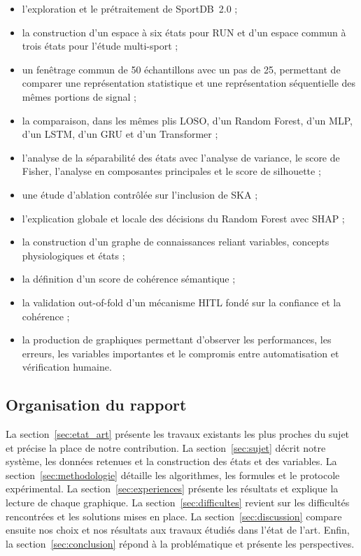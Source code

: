 \documentclass[12pt,a4paper]{article}
\begin{document}
\begin{itemize}[leftmargin=1.5em]
  \item l'exploration et le prétraitement de SportDB~2.0 ;
  \item la construction d'un espace à six états pour RUN et d'un espace commun
  à trois états pour l'étude multi-sport ;
  \item un fenêtrage commun de 50 échantillons avec un pas de 25, permettant
  de comparer une représentation statistique et une représentation
  séquentielle des mêmes portions de signal ;
  \item la comparaison, dans les mêmes plis LOSO, d'un Random Forest, d'un MLP,
  d'un LSTM, d'un GRU et d'un Transformer ;
  \item l'analyse de la séparabilité des états avec l'analyse de variance,
  le score de Fisher, l'analyse en composantes principales et le score de
  silhouette ;
  \item une étude d'ablation contrôlée sur l'inclusion de SKA ;
  \item l'explication globale et locale des décisions du Random Forest avec
  SHAP ;
  \item la construction d'un graphe de connaissances reliant variables,
  concepts physiologiques et états ;
  \item la définition d'un score de cohérence sémantique ;
  \item la validation out-of-fold d'un mécanisme HITL fondé sur la confiance
  et la cohérence ;
  \item la production de graphiques permettant d'observer les performances,
  les erreurs, les variables importantes et le compromis entre automatisation
  et vérification humaine.
\end{itemize}

\subsection{Organisation du rapport}

La section~\ref{sec:etat_art} présente les travaux existants les plus proches
du sujet et précise la place de notre contribution. La
section~\ref{sec:sujet} décrit notre système, les données retenues et la
construction des états et des variables. La section~\ref{sec:methodologie}
détaille les algorithmes, les formules et le protocole expérimental. La
section~\ref{sec:experiences} présente les résultats et explique la lecture de
chaque graphique. La section~\ref{sec:difficultes} revient sur les difficultés
rencontrées et les solutions mises en place. La
section~\ref{sec:discussion} compare ensuite nos choix et nos résultats aux
travaux étudiés dans l'état de l'art. Enfin, la
section~\ref{sec:conclusion} répond à la problématique et présente les
perspectives.
\end{document}

